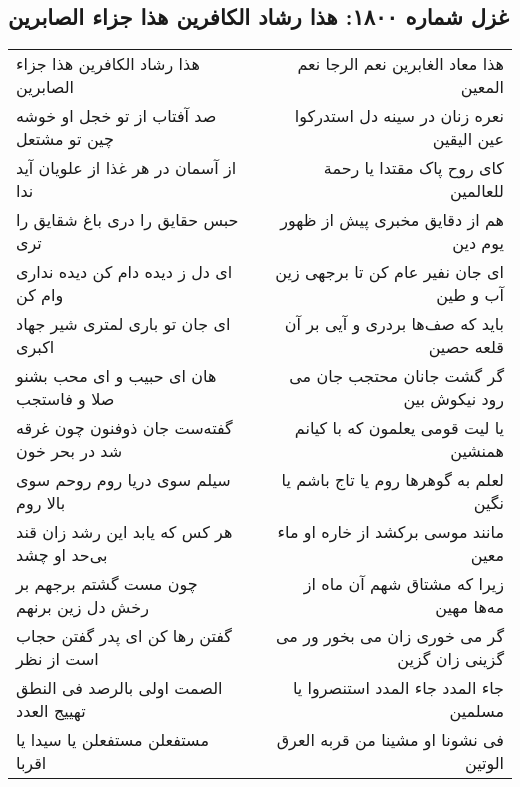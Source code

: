 \begin{center}
\section*{غزل شماره ۱۸۰۰: هذا رشاد الکافرین هذا جزاء الصابرین}
\label{sec:1800}
\begin{longtable}{l p{0.5cm} r}
هذا رشاد الکافرین هذا جزاء الصابرین
&&
هذا معاد الغابرین نعم الرجا نعم المعین
\\
صد آفتاب از تو خجل او خوشه چین تو مشتعل
&&
نعره زنان در سینه دل استدرکوا عین الیقین
\\
از آسمان در هر غذا از علویان آید ندا
&&
کای روح پاک مقتدا یا رحمة للعالمین
\\
حبس حقایق را دری باغ شقایق را تری
&&
هم از دقایق مخبری پیش از ظهور یوم دین
\\
ای دل ز دیده دام کن دیده نداری وام کن
&&
ای جان نفیر عام کن تا برجهی زین آب و طین
\\
ای جان تو باری لمتری شیر جهاد اکبری
&&
باید که صف‌ها بردری و آیی بر آن قلعه حصین
\\
هان ای حبیب و ای محب بشنو صلا و فاستجب
&&
گر گشت جانان محتجب جان می رود نیکوش بین
\\
گفته‌ست جان ذوفنون چون غرقه شد در بحر خون
&&
یا لیت قومی یعلمون که با کیانم همنشین
\\
سیلم سوی دریا روم روحم سوی بالا روم
&&
لعلم به گوهرها روم یا تاج باشم یا نگین
\\
هر کس که یابد این رشد زان قند بی‌حد او چشد
&&
مانند موسی برکشد از خاره او ماء معین
\\
چون مست گشتم برجهم بر رخش دل زین برنهم
&&
زیرا که مشتاق شهم آن ماه از مه‌ها مهین
\\
گفتن رها کن ای پدر گفتن حجاب است از نظر
&&
گر می خوری زان می بخور ور می گزینی زان گزین
\\
الصمت اولی بالرصد فی النطق تهییج العدد
&&
جاء المدد جاء المدد استنصروا یا مسلمین
\\
مستفعلن مستفعلن یا سیدا یا اقربا
&&
فی نشونا او مشینا من قربه العرق الوتین
\\
\end{longtable}
\end{center}
